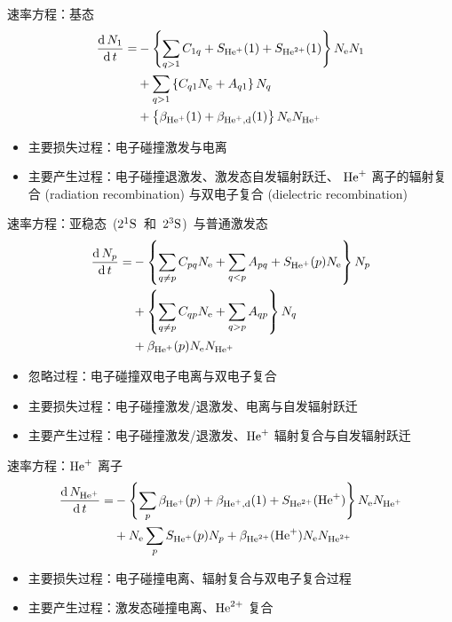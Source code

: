 \begin{CJK*}{UTF8}{kai}
\begin{frame}{速率方程：基态}
	\[
	\begin{aligned}
		\frac{{\rm d}\,N_1}{{\rm d}\,t}=
			&-\left\{\sum_{q>1}C_{1q}+S_{{\rm He}^+}(1)+S_{{\rm He}^{2+}}(1)\right\}N_{\rm e}N_1\\
			&+\sum_{q>1}\left\{C_{q1}N_{\rm e}+A_{q1}\right\}N_q\\
			&+\left\{\beta_{{\rm He}^+}(1)+\beta_{{\rm He}^+,\rm d}(1)\right\}N_{\rm e}N_{{\rm He}^+}
	\end{aligned}
	\]
	\begin{itemize}
		\item 主要损失过程：电子碰撞激发与电离
		\item 主要产生过程：电子碰撞退激发、激发态自发辐射跃迁、
			${\rm He}^+$ 离子的辐射复合 (radiation recombination)
			与双电子复合 (dielectric recombination)
	\end{itemize}
\end{frame}

\begin{frame}{速率方程：亚稳态~($2^1{\rm S}$~和~$2^3{\rm S}$)~与普通激发态}
	\[
	\begin{aligned}
		\frac{{\rm d}\,N_p}{{\rm d}\,t}=
		&-\left\{\sum_{q\ne p}C_{pq}N_{\rm e}+\sum_{q<p}A_{pq}+S_{{\rm He}^+}(p)N_{\rm e}\right\}N_p\\
		&+\left\{\sum_{q\ne p}C_{qp}N_{\rm e}+\sum_{q>p}A_{qp}\right\}N_q\\
		&+\beta_{{\rm He}^+}(p)N_{\rm e}N_{{\rm He}^+}
	\end{aligned}
	\]
	\begin{itemize}
		\item 忽略过程：电子碰撞双电子电离与双电子复合
		\item 主要损失过程：电子碰撞激发/退激发、电离与自发辐射跃迁
		\item 主要产生过程：电子碰撞激发/退激发、${\rm He}^+$ 辐射复合与自发辐射跃迁
	\end{itemize}
\end{frame}

\begin{frame}{速率方程：${\rm He}^+$ 离子}
	\[
	\begin{aligned}
		\frac{{\rm d}\,N_{{\rm He}^+}}{{\rm d}\,t}=
		&-\left\{\sum_{p}\beta_{{\rm He}^+}(p)+\beta_{{\rm He}^+,{\rm d}}(1)+S_{{\rm He}^{2+}}({\rm He}^+)\right\}N_{\rm e}N_{{\rm He}^+}\\
		&+N_{\rm e}\sum_{p}S_{{\rm He}^+}(p)N_p+\beta_{{\rm He}^{2+}}({\rm He}^{+})N_{\rm e}N_{{\rm He}^{2+}}
	\end{aligned}
	\]
	\begin{itemize}
		\item 主要损失过程：电子碰撞电离、辐射复合与双电子复合过程
		\item 主要产生过程：激发态碰撞电离、${\rm He}^{2+}$ 复合
	\end{itemize}
\end{frame}


\end{CJK*}
